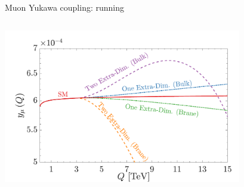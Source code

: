 \documentclass[aspectratio=169]{beamer}
\begin{document}
\begin{frame}{Muon Yukawa coupling: running}
\begin{columns}
\begin{column}{0.48\textwidth}
			\includegraphics[width=0.78\textwidth]{figs/YukawaRunning/ymu2}
			\end{column}
	\end{columns}
\end{frame}
\end{document}
